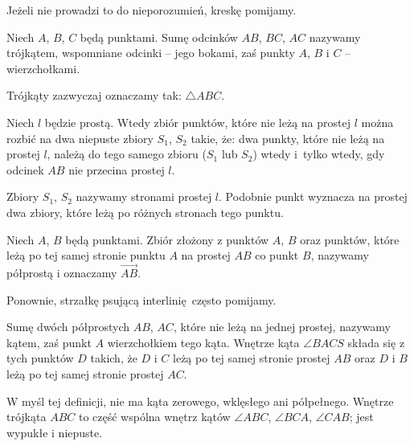Jeżeli nie prowadzi to do nieporozumień, kreskę pomijamy.

\begin{definition}[trójkąt]
    Niech $A$, $B$, $C$ będą punktami.
    Sumę odcinków $AB$, $BC$, $AC$ nazywamy trójkątem, wspomniane odcinki -- jego bokami, zaś punkty $A$, $B$ i $C$ -- wierzchołkami.
\end{definition} %

Trójkąty zazwyczaj oznaczamy tak: $\triangle ABC$.

\begin{proposition}
    Niech $l$ będzie prostą.
    Wtedy zbiór punktów, które nie leżą na prostej $l$ można rozbić na dwa niepuste zbiory $S_1$, $S_2$ takie, że: dwa punkty, które nie leżą na prostej $l$, należą do tego samego zbioru ($S_1$ lub $S_2$) wtedy i~tylko wtedy, gdy odcinek $AB$ nie przecina prostej $l$.
\end{proposition} %

Zbiory $S_1$, $S_2$ nazywamy stronami prostej $l$.
Podobnie punkt wyznacza na prostej dwa zbiory, które leżą po różnych stronach tego punktu.

\begin{definition}[półprosta]
    Niech $A$, $B$ będą punktami.
    Zbiór złożony z punktów $A$, $B$ oraz punktów, które leżą po tej samej stronie punktu $A$ na prostej $AB$ co punkt $B$, nazywamy półprostą i oznaczamy $\overrightarrow{AB}$.
\end{definition} %

Ponownie, strzałkę psującą interlinię często pomijamy.

\begin{definition}[kąt]
    Sumę dwóch półprostych $AB$, $AC$, które nie leżą na jednej prostej, nazywamy kątem, zaś punkt $A$ wierzchołkiem tego kąta.
    Wnętrze kąta $\angle BACS$ składa się z tych punktów $D$ takich, że $D$ i $C$ leżą po tej samej stronie prostej $AB$ oraz $D$ i $B$ leżą po tej samej stronie prostej $AC$. 
\end{definition} %

W myśl tej definicji, nie ma kąta zerowego, wklęsłego ani półpełnego.
%
%
Wnętrze trójkąta $ABC$ to część wspólna wnętrz kątów $\angle ABC$, $\angle BCA$, $\angle CAB$; jest wypukłe i niepuste.

%